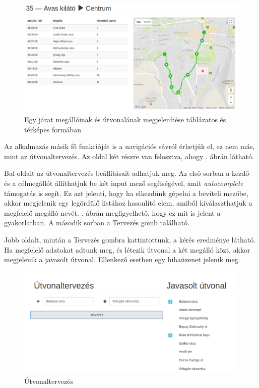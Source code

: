 \begin{figure}[h!]
\centering
\includegraphics[scale=0.35]{kepek/trip_tablazat_es_terkep.png}
\caption{Egy járat megállóinak és útvonalának megjelenítése táblázatos és térképes formában}
\label{fig:trip_tablazat_es_terkep}
\end{figure}

Az alkalmazás másik fő funkcióját is a navigációs sávról érhetjük el, ez nem más, mint az útvonaltervezés. Az oldal két részre van felosztva, ahogy . ábrán látható.

Bal oldalt az útvonaltervezés beállításait adhatjuk meg. Az első sorban a kezdő- és a célmegállót állíthatjuk be két input mező segítségével, amit \textit{autocomplete} támogatás is segít. Ez azt jelenti, hogy ha elkezdünk gépelni a beviteli mezőbe, akkor megjelenik egy legördülő listához hasonlító elem, amiből kiválaszthatjuk a megfelelő megálló nevét. . ábrán megfigyelhető, hogy ez mit is jelent a gyakorlatban. A második sorban a Tervezés gomb található.

Jobb oldalt, miután a Tervezés gombra kattintottunk, a kérés eredménye látható. Ha megfelelő adatokat adtunk meg, és létezik útvonal a két megálló közt, akkor megjelenik a javasolt útvonal. Ellenkező esetben egy hibaüzenet jelenik meg.

\begin{figure}[h!]
\centering
\includegraphics[scale=0.45]{kepek/trip_planner.png}
\caption{Útvonaltervezés}
\label{fig:trip_planner}
\end{figure}

